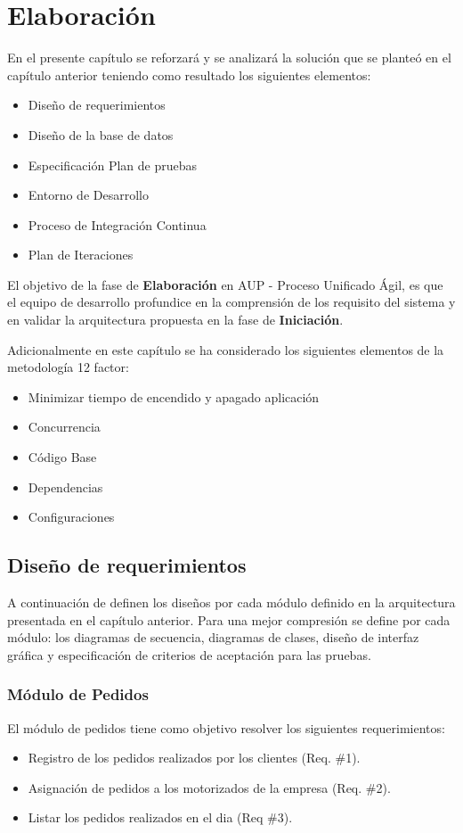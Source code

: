 
\chapter{Elaboración}
\noindent En el presente capítulo se reforzará y se analizará la solución que se planteó en el capítulo anterior teniendo como resultado los siguientes elementos:

\begin{itemize}
\item Diseño de requerimientos
\item Diseño de la base de datos
\item Especificación Plan de pruebas
\item Entorno de Desarrollo
\item Proceso de Integración Continua
\item Plan de Iteraciones 
\end{itemize}

\noindent El objetivo de la fase de \textbf{Elaboración} en AUP - Proceso Unificado Ágil, es que el equipo de desarrollo profundice en la comprensión de los requisito del sistema y en validar la arquitectura propuesta en la fase de \textbf{Iniciación}.

\noindent Adicionalmente en este capítulo se ha considerado los siguientes elementos de la metodología 12 factor:
\begin{itemize}
\item Minimizar tiempo de encendido y apagado aplicación
\item Concurrencia
\item Código Base
\item Dependencias
\item Configuraciones
\end{itemize}

\section{Diseño de requerimientos}
\noindent A continuación de definen los diseños por cada módulo definido en la arquitectura presentada en el capítulo anterior. Para una mejor compresión se define por cada módulo: los diagramas de secuencia, diagramas de clases, diseño de interfaz gráfica y especificación de criterios de aceptación para las pruebas.

\subsection{Módulo de Pedidos}
\noindent El módulo de pedidos tiene como objetivo resolver los siguientes requerimientos:
\begin{itemize}
\item Registro de los pedidos realizados por los clientes (Req. \#1).
\item Asignación de pedidos a los motorizados de la empresa (Req. \#2).
\item Listar los pedidos realizados en el dia (Req \#3).
\end{itemize}

